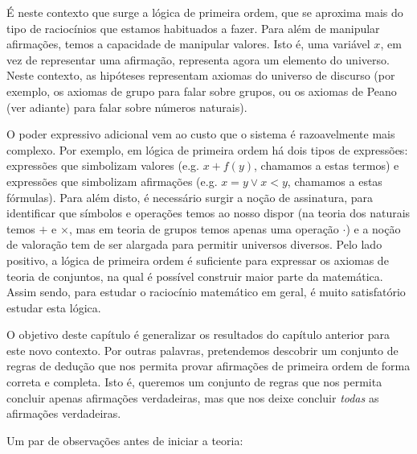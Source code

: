 \documentclass{report}
\theoremstyle{definition}
\theoremstyle{remark}
\begin{document}
	É neste contexto que surge a lógica de primeira ordem, que se aproxima mais do tipo de raciocínios que estamos habituados a fazer. Para além de manipular afirmações, temos a capacidade de manipular valores. Isto é, uma variável $x$, em vez de representar uma afirmação, representa agora um elemento do universo. Neste contexto, as hipóteses representam axiomas do universo de discurso (por exemplo, os axiomas de grupo para falar sobre grupos, ou os axiomas de Peano (ver adiante) para falar sobre números naturais).
	
	O poder expressivo adicional vem ao custo que o sistema é razoavelmente mais complexo. Por exemplo, em lógica de primeira ordem há dois tipos de expressões: expressões que simbolizam valores (e.g. $x + f(y)$, chamamos a estas termos) e expressões que simbolizam afirmações (e.g. $x = y \lor x < y$, chamamos a estas fórmulas). Para além disto, é necessário surgir a noção de assinatura, para identificar que símbolos e operações temos ao nosso dispor (na teoria dos naturais temos $+$ e $\times$, mas em teoria de grupos temos apenas uma operação $\cdot$) e a noção de valoração tem de ser alargada para permitir universos diversos. Pelo lado positivo, a lógica de primeira ordem é suficiente para expressar os axiomas de teoria de conjuntos, na qual é possível construir maior parte da matemática. Assim sendo, para estudar o raciocínio matemático em geral, é muito satisfatório estudar esta lógica.
	
	O objetivo deste capítulo é generalizar os resultados do capítulo anterior para este novo contexto. Por outras palavras, pretendemos descobrir um conjunto de regras de dedução que nos permita provar afirmações de primeira ordem de forma correta e completa. Isto é, queremos um conjunto de regras que nos permita concluir apenas afirmações verdadeiras, mas que nos deixe concluir \emph{todas} as afirmações verdadeiras.
	
	Um par de observações antes de iniciar a teoria:
	
\end{document}
